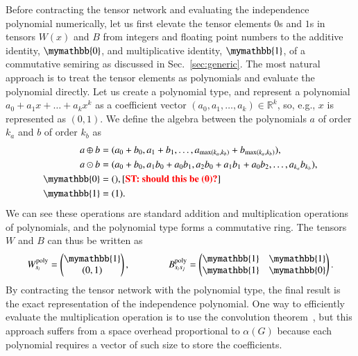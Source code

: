 \documentclass[onefignum, onetabnum]{siamart190516}
\newcommand{\<}{\langle}
\renewcommand{\>}{\rangle}
\newcommand{\red}[1]{[{\bf  \color{red}{ST: #1}}]}
\begin{document}
Before contracting the tensor network and evaluating the independence polynomial numerically, let us first elevate the tensor elements $0$s and $1$s in tensors $W(x)$ and $B$ from integers and floating point numbers to the additive identity, $\mymathbb{0}$, and multiplicative identity, $\mymathbb{1}$, of a commutative semiring as discussed in Sec.~\ref{sec:generic}. The most natural approach is to treat the tensor elements as polynomials and evaluate the polynomial directly. Let us create a polynomial type, and represent a polynomial $a_0 + a_1 x + \ldots + a_k x^k$ as a coefficient vector $(a_0, a_1, \ldots, a_k) \in \mathbb{R}^k$, so, e.g., $x$ is represented as $(0, 1)$. We define the algebra between the polynomials $a$ of order $k_a$ and $b$ of order $k_b$ as
\begin{equation}
    \begin{split}
    a \oplus b &= (a_0 + b_0, a_1 + b_1, \ldots, a_{\max(k_a, k_b)} + b_{\max(k_a, k_b)}),\\
    a \odot b &= (a_0 + b_0, a_1b_0 + a_0b_1, a_{2}b_{0} + a_{1}b_{1} + a_{0}b_{2},  \ldots, a_{k_a} b_{k_b}),\\
    \mymathbb{0} &= (), \text{\red{should this be (0)?}} \\
    \mymathbb{1} &= (1).\label{eq:polynomial}
    \end{split}
\end{equation}
We can see these operations are standard addition and multiplication operations of polynomials, and the polynomial type forms a commutative ring. The tensors $W$ and $B$ can thus be written as 
\begin{equation}
    W_{s_i}^{\rm poly} = \left(\begin{matrix}
        \mymathbb{1} \\
        (0,1)
    \end{matrix}\right),   
    \qquad \qquad
        B_{s_i s_j}^{\rm poly} = \left(\begin{matrix}
        \mymathbb{1}  & \mymathbb{1} \\
        \mymathbb{1} & \mymathbb{0}
    \end{matrix}\right).
\end{equation}
By contracting the tensor network with the polynomial type, the final result is the exact representation of the independence polynomial. One way to efficiently evaluate the multiplication operation is to use the convolution theorem~\cite{Schonhage1971}, but this approach suffers from a space overhead proportional to $\alpha(G)$ because each polynomial requires a vector of such size to store the coefficients. 
\end{document}
